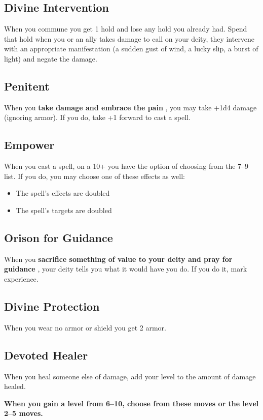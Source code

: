 \subsection{Divine Intervention}

When you commune you get 1 hold and lose any hold you already had. Spend that hold when you or an ally takes damage to call on your deity, they intervene with an appropriate manifestation (a sudden gust of wind, a lucky slip, a burst of light) and negate the damage.
\subsection{Penitent}

When you \textbf{take damage and embrace the pain}
, you may take +1d4 damage (ignoring armor). If you do, take +1 forward to cast a spell.
\subsection{Empower}

When you cast a spell, on a 10+ you have the option of choosing from the 7--9 list. If you do, you may choose one of these effects as well:
\begin{itemize}
\item The spell's effects are doubled
\item The spell's targets are doubled

\end{itemize}
\subsection{Orison for Guidance}

When you \textbf{sacrifice something of value to your deity and pray for guidance}
, your deity tells you what it would have you do. If you do it, mark experience.
\subsection{Divine Protection}

When you wear no armor or shield you get 2 armor.
\subsection{Devoted Healer}

When you heal someone else of damage, add your level to the amount of damage healed.

\vspace{\baselineskip}
{\bfseries When you gain a level from 6--10, choose from these moves or the level 2--5 moves.}
